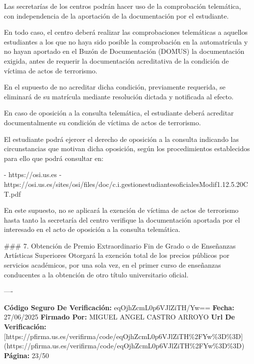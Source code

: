 \documentclass{article}
\begin{document}
\begin{itemize}
\begin{itemize}
\begin{scriptsize}
                  Las secretarías de los centros podrán hacer uso de la comprobación telemática, con independencia de la aportación de la documentación por el estudiante.

                  En todo caso, el centro deberá realizar las comprobaciones telemáticas a aquellos estudiantes a los que no haya sido posible la comprobación en la automatrícula y no hayan aportado en el Buzón de Documentación (DOMUS) la documentación exigida, antes de requerir la documentación acreditativa de la condición de víctima de actos de terrorismo.

                  En el supuesto de no acreditar dicha condición, previamente requerida, se eliminará de su matrícula mediante resolución dictada y notificada al efecto.

                  En caso de oposición a la consulta telemática, el estudiante deberá acreditar documentalmente su condición de víctima de actos de terrorismo.

                  El estudiante podrá ejercer el derecho de oposición a la consulta indicando las circunstancias que motivan dicha oposición, según los procedimientos establecidos para ello que podrá consultar en:

                  - https://osi.us.es
                  - https://osi.us.es/sites/osi/files/doc/c.i.gestionestudiantesoficialesModif1.12.5.20CT.pdf

                  En este supuesto, no se aplicará la exención de víctima de actos de terrorismo hasta tanto la secretaría del centro verifique la documentación aportada por el interesado en el acto de oposición a la consulta telemática.

                  \#\#\# 7. Obtención de Premio Extraordinario Fin de Grado o de Enseñanzas Artísticas Superiores
                  Otorgará la exención total de los precios públicos por servicios académicos, por una sola vez, en el primer curso de enseñanzas conducentes a la obtención de otro título universitario oficial.

                  ----

                  \textbf{Código Seguro De Verificación:} eqOjhZcmL0p6VJlZiTH/Yw==
                  \textbf{Fecha:} 27/06/2025
                  \textbf{Firmado Por:} MIGUEL ANGEL CASTRO ARROYO
                  \textbf{Url De Verificación:} [https://pfirma.us.es/verifirma/code/eqOjhZcmL0p6VJlZiTH\%2FYw\%3D\%3D](https://pfirma.us.es/verifirma/code/eqOjhZcmL0p6VJlZiTH\%2FYw\%3D\%3D)
                  \textbf{Página:} 23/50


\end{scriptsize}
\end{itemize}
\end{itemize}
\end{document}
